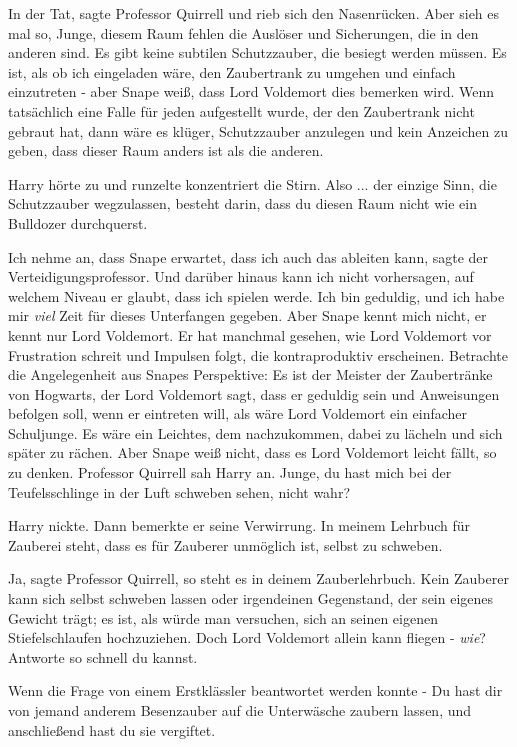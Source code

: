\glqq{}In der Tat\grqq{}, sagte Professor Quirrell und rieb sich den Nasenrücken.
\glqq{}Aber sieh es mal so, Junge, diesem Raum fehlen die Auslöser und
Sicherungen, die in den anderen sind. Es gibt keine subtilen Schutzzauber, die
besiegt werden müssen. Es ist, als ob ich eingeladen wäre, den Zaubertrank zu
umgehen und einfach einzutreten - aber Snape weiß, dass Lord Voldemort dies
bemerken wird. Wenn tatsächlich eine Falle für jeden aufgestellt wurde, der den
Zaubertrank nicht gebraut hat, dann wäre es klüger, Schutzzauber anzulegen und
kein Anzeichen zu geben, dass dieser Raum anders ist als die anderen.\grqq{}

Harry hörte zu und runzelte konzentriert die Stirn. \glqq{}Also ... der einzige
Sinn, die Schutzzauber wegzulassen, besteht darin, dass du diesen Raum nicht wie
ein Bulldozer durchquerst.\grqq{}

\glqq{}Ich nehme an, dass Snape erwartet, dass ich auch das ableiten kann\grqq{},
sagte der Verteidigungsprofessor. \glqq{}Und darüber hinaus kann ich nicht
vorhersagen, auf welchem Niveau er glaubt, dass ich spielen werde. Ich bin
geduldig, und ich habe mir \emph{viel} Zeit für dieses Unterfangen gegeben. Aber
Snape kennt mich nicht, er kennt nur Lord Voldemort. Er hat manchmal gesehen,
wie Lord Voldemort vor Frustration schreit und Impulsen folgt, die
kontraproduktiv erscheinen. Betrachte die Angelegenheit aus Snapes Perspektive:
Es ist der Meister der Zaubertränke von Hogwarts, der Lord Voldemort sagt, dass
er geduldig sein und Anweisungen befolgen soll, wenn er eintreten will, als wäre
Lord Voldemort ein einfacher Schuljunge. Es wäre ein Leichtes, dem nachzukommen,
dabei zu lächeln und sich später zu rächen. Aber Snape weiß nicht, dass es Lord
Voldemort leicht fällt, so zu denken.\grqq{} Professor Quirrell sah Harry an. \glqq{}
Junge, du hast mich bei der Teufelsschlinge in der Luft schweben sehen, nicht
wahr?\grqq{}

Harry nickte. Dann bemerkte er seine Verwirrung. \glqq{}In meinem Lehrbuch für
Zauberei steht, dass es für Zauberer unmöglich ist, selbst zu schweben.\grqq{}

\glqq{}Ja\grqq{}, sagte Professor Quirrell, \glqq{}so steht es in deinem
Zauberlehrbuch. Kein Zauberer kann sich selbst schweben lassen oder irgendeinen
Gegenstand, der sein eigenes Gewicht trägt; es ist, als würde man versuchen,
sich an seinen eigenen Stiefelschlaufen hochzuziehen. Doch Lord Voldemort allein
kann fliegen - \emph{wie}? Antworte so schnell du kannst.\grqq{}

Wenn die Frage von einem Erstklässler beantwortet werden konnte - \glqq{}Du hast
dir von jemand anderem Besenzauber auf die Unterwäsche zaubern lassen, und
anschließend hast du sie vergiftet.\grqq{}

